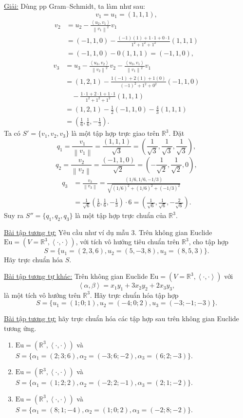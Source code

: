 \documentclass[12pt,a4paper]{article}
\newcommand{\R}{\mathbb{R}}
\newcommand{\Eu}{\mathrm{Eu}}
\newcommand{\ip}[2]{\left\langle #1,#2\right\rangle}
\newcommand{\norm}[1]{\left\lVert #1\right\rVert}
\begin{document}
\underline{Giải:} Dùng pp Gram--Schmidt, ta làm như sau:
\[
v_1=u_1=(1,1,1),
\]
\[
\begin{aligned}
v_2&=u_2-\frac{\ip{u_2}{v_1}}{\norm{v_1}^2}v_1\\
&=(-1,1,0)-\frac{(-1)(1)+1\cdot1+0\cdot1}{1^2+1^2+1^2}(1,1,1)\\
&=(-1,1,0)-0(1,1,1)=(-1,1,0),
\end{aligned}
\]
\[
\begin{aligned}
v_3&=u_3-\frac{\ip{u_3}{v_2}}{\norm{v_2}^2}v_2-\frac{\ip{u_3}{v_1}}{\norm{v_1}^2}v_1\\
&=(1,2,1)-\frac{1(-1)+2(1)+1(0)}{(-1)^2+1^2+0^2}(-1,1,0)\\
&\quad-\frac{1\cdot1+2\cdot1+1\cdot1}{1^2+1^2+1^2}(1,1,1)\\
&=(1,2,1)-\frac12(-1,1,0)-\frac43(1,1,1)\\
&=\left(\frac16,\frac16,-\frac13\right).
\end{aligned}
\]
Ta có $S'=\{v_1,v_2,v_3\}$ là một tập hợp trực giao trên $\R^3$.
Đặt
\[
q_1=\frac{v_1}{\norm{v_1}}=\frac{(1,1,1)}{\sqrt3}=\left(\frac1{\sqrt3},\frac1{\sqrt3},\frac1{\sqrt3}\right),
\]
\[
q_2=\frac{v_2}{\norm{v_2}}=\frac{(-1,1,0)}{\sqrt2}=\left(-\frac1{\sqrt2},\frac1{\sqrt2},0\right),
\]
\[
\begin{aligned}
q_3&=\frac{v_3}{\norm{v_3}}
=\frac{(1/6,1/6,-1/3)}{\sqrt{(1/6)^2+(1/6)^2+(-1/3)^2}}\\
&=\frac1{\sqrt6}\left(\frac16,\frac16,-\frac13\right)\cdot 6
=\left(\frac1{\sqrt6},\frac1{\sqrt6},-\frac2{\sqrt6}\right).
\end{aligned}
\]
Suy ra $S''=\{q_1,q_2,q_3\}$ là một tập hợp trực chuẩn của $\R^3$.

\underline{Bài tập tương tự:} Yêu cầu như ví dụ mẫu 3. Trên không gian Euclide $\Eu=(V=\R^3,\ip{\cdot}{\cdot})$, với tích vô hướng tiêu chuẩn trên $\R^3$, cho tập hợp
\[
S=\{u_1=(2,3,6),u_2=(5,-3,8),u_3=(8,5,3)\}.
\]
Hãy trực chuẩn hóa $S$.

\underline{Bài tập tương tự khác:} Trên không gian Euclide $\Eu=(V=\R^3,\ip{\cdot}{\cdot})$ với
\[
\ip{\alpha}{\beta}=x_1y_1+3x_2y_2+2x_3y_3,
\]
là một tích vô hướng trên $\R^3$. Hãy trực chuẩn hóa tập hợp
\[
S=\{u_1=(1;0;1),u_2=(-4;0;2),u_3=(-3;-1;-3)\}.
\]

\underline{Bài tập tương tự:} hãy trực chuẩn hóa các tập hợp sau trên không gian Euclide tương ứng.
\begin{enumerate}
\item $\Eu=(\R^3,\ip{\cdot}{\cdot})$ và $S=\{\alpha_1=(2;3;6),\alpha_2=(-3;6;-2),\alpha_3=(6;2;-3)\}$.
\item $\Eu=(\R^3,\ip{\cdot}{\cdot})$ và $S=\{\alpha_1=(1;2;2),\alpha_2=(-2;2;-1),\alpha_3=(2;1;-2)\}$.
\item $\Eu=(\R^3,\ip{\cdot}{\cdot})$ và $S=\{\alpha_1=(8;1;-4),\alpha_2=(1;0;2),\alpha_3=(-2;8;-2)\}$.
\end{enumerate}
\end{document}
